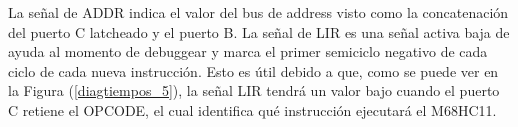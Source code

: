 La señal de ADDR indica el valor del bus de address visto como la concatenación del puerto C latcheado y el puerto B. La señal de LIR es una señal activa baja de ayuda al momento de debuggear y marca el primer semiciclo negativo de cada ciclo de cada nueva instrucción. Esto es útil debido a que, como se puede ver en la Figura (\ref{diagtiempos_5}), la señal LIR tendrá un valor bajo cuando el puerto C retiene el OPCODE, el cual identifica qué instrucción ejecutará el M68HC11.

